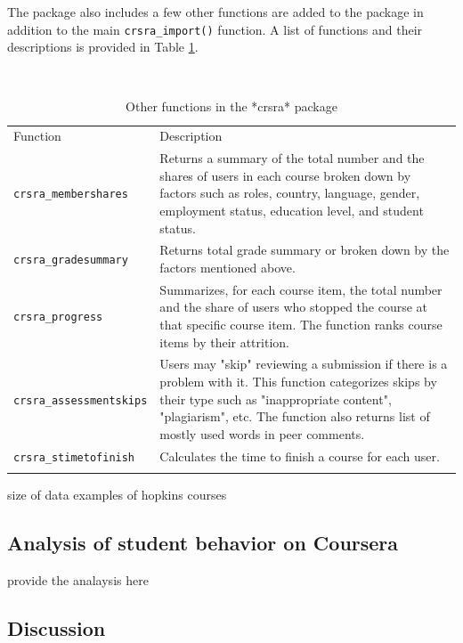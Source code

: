 The package also includes a few other functions are added to the package
in addition to the main \texttt{crsra\_import()} function. A list of
functions and their descriptions is provided in Table
\ref{tab:functions}.

\begin{table}
\footnotesize
\caption{Other functions in the *crsra* package}\
\centering
\label{tab:functions}
\begin{tabular}{p{3cm}|p{7cm}}
Function & Description \\
\addlinespace
\toprule
\texttt{crsra\_membershares} & Returns a summary of the total number and the shares of users in each course broken down by factors such as roles, country, language, gender, employment status, education level, and student status.\\
\midrule
\texttt{crsra\_gradesummary} & Returns total grade summary or broken down by the factors mentioned above.\\
\midrule
\texttt{crsra\_progress} & Summarizes, for each course item, the total number and the share of users who stopped the course at that specific course item. The function ranks course items by their attrition.\\
\midrule
\texttt{crsra\_assessmentskips} & Users may "skip" reviewing a submission if there is a problem with it. This function categorizes skips by their type such as "inappropriate content", "plagiarism", etc. The function also returns list of mostly used words in peer comments.\\
\midrule
\texttt{crsra\_stimetofinish} & Calculates the time to finish a course for each user.\\
\addlinespace
\bottomrule
\end{tabular}
\end{table}

size of data examples of hopkins courses

\subsection{Analysis of student behavior on
Coursera}\label{analysis-of-student-behavior-on-coursera}

provide the analaysis here

\subsection{Discussion}\label{discussion}




